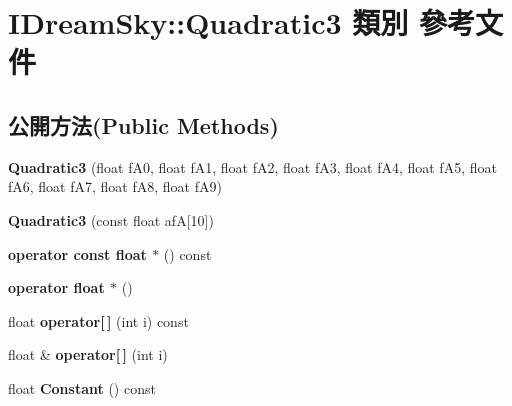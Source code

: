 \hypertarget{class_i_dream_sky_1_1_quadratic3}{}\section{I\+Dream\+Sky\+:\+:Quadratic3 類別 參考文件}
\label{class_i_dream_sky_1_1_quadratic3}
\subsection*{公開方法(Public Methods)}
\begin{DoxyCompactItemize}
\item 
{\bfseries Quadratic3} (float f\+A0, float f\+A1, float f\+A2, float f\+A3, float f\+A4, float f\+A5, float f\+A6, float f\+A7, float f\+A8, float f\+A9)\hypertarget{class_i_dream_sky_1_1_quadratic3_aec085c92fc3011c6ce12600222d350b8}{}\label{class_i_dream_sky_1_1_quadratic3_aec085c92fc3011c6ce12600222d350b8}

\item 
{\bfseries Quadratic3} (const float afA\mbox{[}10\mbox{]})\hypertarget{class_i_dream_sky_1_1_quadratic3_a5bb1acb6adfeca333a8d7a55afc8d14e}{}\label{class_i_dream_sky_1_1_quadratic3_a5bb1acb6adfeca333a8d7a55afc8d14e}

\item 
{\bfseries operator const float $\ast$} () const \hypertarget{class_i_dream_sky_1_1_quadratic3_ad95b8c320cecbf53b23fefa66a39e6c0}{}\label{class_i_dream_sky_1_1_quadratic3_ad95b8c320cecbf53b23fefa66a39e6c0}

\item 
{\bfseries operator float $\ast$} ()\hypertarget{class_i_dream_sky_1_1_quadratic3_a20dc0e82e044e53856982c151c9205ca}{}\label{class_i_dream_sky_1_1_quadratic3_a20dc0e82e044e53856982c151c9205ca}

\item 
float {\bfseries operator\mbox{[}$\,$\mbox{]}} (int i) const \hypertarget{class_i_dream_sky_1_1_quadratic3_a9c06b261e8a4e95c4ebed62b67d420d3}{}\label{class_i_dream_sky_1_1_quadratic3_a9c06b261e8a4e95c4ebed62b67d420d3}

\item 
float \& {\bfseries operator\mbox{[}$\,$\mbox{]}} (int i)\hypertarget{class_i_dream_sky_1_1_quadratic3_a2c6b80a1654005c2348f5c9cf6040841}{}\label{class_i_dream_sky_1_1_quadratic3_a2c6b80a1654005c2348f5c9cf6040841}

\item 
float {\bfseries Constant} () const \hypertarget{class_i_dream_sky_1_1_quadratic3_a38c8a75ffd281894a04da9922536d536}{}\label{class_i_dream_sky_1_1_quadratic3_a38c8a75ffd281894a04da9922536d536}


\end{DoxyCompactItemize}

